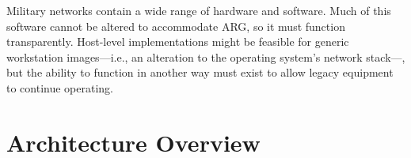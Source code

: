 
\par Military networks contain a wide range of hardware and software. Much of this software cannot be altered to accommodate ARG, so it must function transparently. Host-level implementations might be feasible for generic workstation images---i.e., an alteration to the operating system's network stack---, but the ability to function in another way must exist to allow legacy equipment to continue operating.


\section{Architecture Overview}
\label{sec:arg_impl_overview}

